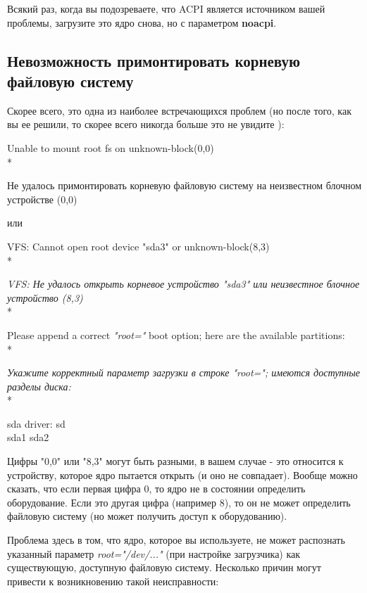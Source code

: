 \documentclass[10pt]{book}
\begin{document}
Всякий раз, когда вы подозреваете, что ACPI является источником вашей проблемы, загрузите это ядро снова, но с параметром \textbf{noacpi}.

\subsection{Невозможность примонтировать корневую файловую систему}

Скорее всего, это одна из наиболее встречающихся проблем (но после того, как вы ее решили, то скорее всего никогда больше это не увидите ):

\vspace{3mm}
\begin{tcolorbox}
Unable to mount root fs on unknown-block(0,0) \\*

Не удалось примонтировать корневую файловую систему на неизвестном блочном устройстве (0,0)
\end{tcolorbox}

или

\vspace{3mm}
\begin{tcolorbox}
VFS: Cannot open root device "sda3" or unknown-block(8,3) \\*

\textit{VFS: Не удалось открыть корневое устройство "sda3" или неизвестное блочное устройство (8,3)} \\*

Please append a correct \textit{"root="} boot option; here are the available partitions: \\*

\textit{Укажите корректный параметр загрузки в строке \textit{"root="}; имеются доступные разделы диска:}\\*

sda driver: sd\\
sda1 sda2
\end{tcolorbox}

Цифры "0,0"  или  "8,3"  могут быть разными, в вашем случае - это относится к устройству, которое ядро пытается открыть (и оно не совпадает). Вообще можно сказать, что если первая цифра 0, то ядро не в состоянии определить оборудование. Если это другая цифра (например 8), то он не может определить файловую систему (но может получить доступ к оборудованию).

Проблема здесь в том, что ядро, которое вы используете, не может  распознать указанный параметр \textit{root="/dev/..."} (при настройке загрузчика) как существующую, доступную файловую систему. Несколько причин могут привести к возникновению такой неисправности:
\end{document}
